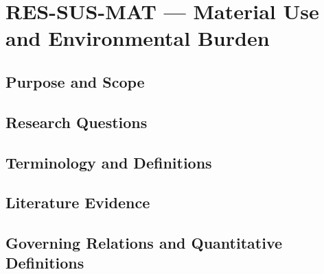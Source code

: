 
\section{RES-SUS-MAT --- Material Use and Environmental Burden}
\label{sec:res-sus-mat}

\subsection{Purpose and Scope}
\label{sec:res-sus-mat-purpose}


\subsection{Research Questions}
\label{sec:res-sus-mat-research-questions}


\subsection{Terminology and Definitions}
\label{sec:res-sus-mat-definitions}


\subsection{Literature Evidence}
\label{sec:res-sus-mat-literature-evidence}

%

\subsection{Governing Relations and Quantitative Definitions}
\label{sec:res-sus-mat-governing-relations}

